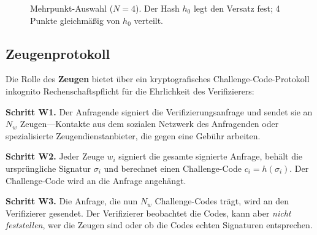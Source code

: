 \documentclass[11pt,a4paper,twocolumn]{article}
\begin{document}
\begin{figure}[ht]
\centering
{}
\caption{Mehrpunkt-Auswahl ($N{=}4$). Der Hash $h_0$ legt den Versatz fest; 4 Punkte gleichmäßig von $h_0$ verteilt.}
\label{fig:multipoint}
\end{figure}

\subsection{Zeugenprotokoll}

Die Rolle des \textbf{Zeugen} bietet über ein kryptografisches Challenge-Code-Protokoll inkognito Rechenschaftspflicht für die Ehrlichkeit des Verifizierers:

\textbf{Schritt W1.} Der Anfragende signiert die Verifizierungsanfrage und sendet sie an $N_w$ Zeugen---Kontakte aus dem sozialen Netzwerk des Anfragenden oder spezialisierte Zeugendienstanbieter, die gegen eine Gebühr arbeiten.

\textbf{Schritt W2.} Jeder Zeuge $w_i$ signiert die gesamte signierte Anfrage, behält die ursprüngliche Signatur $\sigma_i$ und berechnet einen Challenge-Code $c_i = h(\sigma_i)$. Der Challenge-Code wird an die Anfrage angehängt.

\textbf{Schritt W3.} Die Anfrage, die nun $N_w$ Challenge-Codes trägt, wird an den Verifizierer gesendet. Der Verifizierer beobachtet die Codes, kann aber \emph{nicht feststellen}, wer die Zeugen sind oder ob die Codes echten Signaturen entsprechen.
\end{document}
